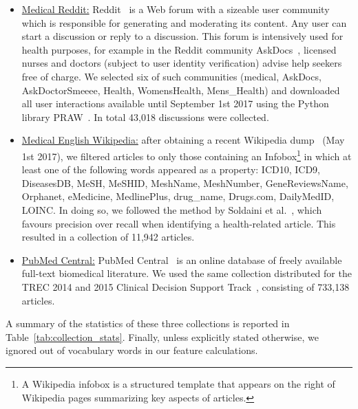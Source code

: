 \begin{itemize}[leftmargin=*]
\item \underline{Medical Reddit:} Reddit~\cite{reddit} is a Web forum with a sizeable user community which is responsible for generating and moderating its content. Any user can start a discussion or reply to a discussion. This forum is intensively used for health purposes, for example in the Reddit community AskDocs~\cite{redditaskdocs}, licensed nurses and doctors (subject to user identity verification) advise help seekers free of charge. We selected six of such communities
    (medical, AskDocs, AskDoctorSmeeee, Health, WomensHealth, Mens\_Health) and downloaded all user interactions available until September 1st 2017 using the Python library PRAW~\cite{redditapi}. In total 43,018 discussions were collected.

\item \underline{Medical English Wikipedia:} after obtaining a recent  Wikipedia dump~\cite{wikipedia} (May 1st 2017), we filtered articles to only those  containing an Infobox\footnote{A Wikipedia infobox is a structured template that appears on the right of Wikipedia pages summarizing key aspects of articles.} in which at least one of the following words appeared as a property: ICD10, ICD9, DiseasesDB, MeSH, MeSHID, MeshName, MeshNumber, GeneReviewsName, Orphanet, eMedicine, MedlinePlus, drug\_name, Drugs.com, DailyMedID, LOINC.
In doing so, we followed the method by Soldaini et al.~\cite{soldaini15}, which favours precision over recall when identifying a health-related article. This resulted in a collection of 11,942 articles. 

\item \underline{PubMed Central:} PubMed Central~\cite{pubmed} is an online  database of freely available full-text biomedical literature. We used the same collection distributed for the TREC 2014 and 2015 Clinical Decision Support Track~\cite{roberts16,trec15}, consisting of 733,138 articles. 
 
\end{itemize}

A summary of the statistics of these three collections is reported in Table~\ref{tab:collection_stats}. 
Finally, unless explicitly stated otherwise, we ignored out of vocabulary words in our feature calculations.


